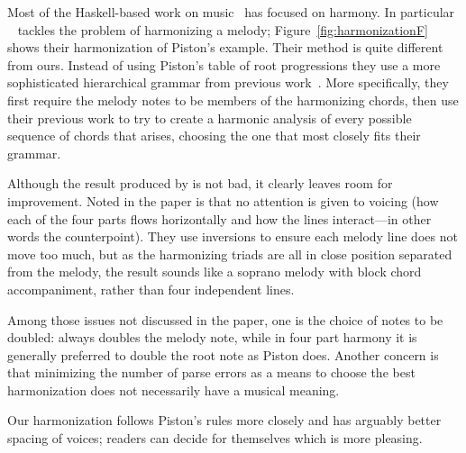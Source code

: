 \HarmonizationF

Most of the Haskell-based work on
music~\citep{magalhaes-harmtrace,koops-fharm,magalhaes-fcomp} has
focused on harmony. In particular \fharm~\citep{koops-fharm} tackles
the problem of harmonizing a melody;
Figure~\ref{fig:harmonizationF} shows their harmonization of
Piston's example. Their method is quite different from
ours. Instead of using Piston's table of root progressions they use a
more sophisticated hierarchical grammar from previous
work~\citep{magalhaes-harmtrace}.
More specifically, they first require the melody notes to be members of
the harmonizing chords, then use their previous work to try to create
a harmonic analysis of every possible sequence of chords that arises,
choosing the one that most closely fits their grammar.

Although the result produced by \fharm is not bad, it clearly leaves
room for improvement. Noted in
the paper is that no attention is given to voicing (how each of the
four parts flows horizontally and how the lines interact---in other
words the counterpoint). They use inversions to ensure each melody line
does not move too much, but as the harmonizing triads are all in close
position separated from the melody, the result sounds like a soprano
melody with block chord accompaniment, rather than four independent
lines.

Among those issues not discussed in the paper, one is the choice of
notes to be doubled: \fharm always doubles the melody note, while
in four part harmony it is generally preferred to double the root
note as Piston does.
Another concern is that minimizing the number of parse errors as a means
to choose the best harmonization does not necessarily have a musical
meaning.

Our harmonization follows Piston's rules more closely and has arguably
better spacing of voices; readers can decide for themselves which is
more pleasing.
